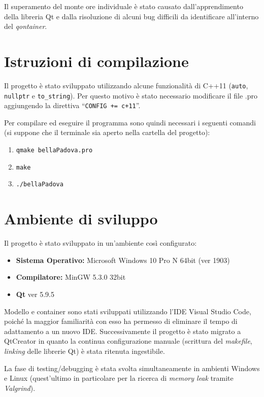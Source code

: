 \documentclass[
  10pt,
]{article}
\providecommand{\tightlist}{%
  \setlength{\itemsep}{0pt}\setlength{\parskip}{0pt}}
\begin{document}
Il superamento del monte ore individuale è stato causato
dall'apprendimento della libreria Qt e dalla risoluzione di alcuni bug
difficili da identificare all'interno del \emph{qontainer}.

\hypertarget{istruzioni-di-compilazione}{%
\section{Istruzioni di compilazione}\label{istruzioni-di-compilazione}}

Il progetto è stato sviluppato utilizzando alcune funzionalità di C++11
(\texttt{auto}, \texttt{nullptr} e \texttt{to\_string}). Per questo
motivo è stato necessario modificare il file .pro aggiungendo la
direttiva ``\texttt{CONFIG\ +=\ c+11}''.

Per compilare ed eseguire il programma sono quindi necessari i seguenti
comandi (si suppone che il terminale sia aperto nella cartella del
progetto):

\begin{enumerate}
\def\labelenumi{\arabic{enumi}.}
\tightlist
\item
  \texttt{qmake\ bellaPadova.pro}
\item
  \texttt{make}
\item
  \texttt{./bellaPadova}
\end{enumerate}

\hypertarget{ambiente-di-sviluppo}{%
\section{Ambiente di sviluppo}\label{ambiente-di-sviluppo}}

Il progetto è stato sviluppato in un'ambiente così configurato:

\begin{itemize}
\tightlist
\item
  \textbf{Sistema Operativo:} Microsoft Windows 10 Pro N 64bit (ver
  1903)
\item
  \textbf{Compilatore:} MinGW 5.3.0 32bit
\item
  \textbf{Qt} ver 5.9.5
\end{itemize}

Modello e container sono stati sviluppati utilizzando l'IDE Visual
Studio Code, poiché la maggior familiarità con esso ha permesso di
eliminare il tempo di adattamento a un nuovo IDE. Successivamente il
progetto è stato migrato a QtCreator in quanto la continua
configurazione manuale (scrittura del \emph{makefile}, \emph{linking}
delle librerie Qt) è stata ritenuta ingestibile.

La fase di testing/debugging è stata svolta simultaneamente in ambienti
Windows e Linux (quest'ultimo in particolare per la ricerca di
\emph{memory leak} tramite \emph{Valgrind}).
\end{document}
